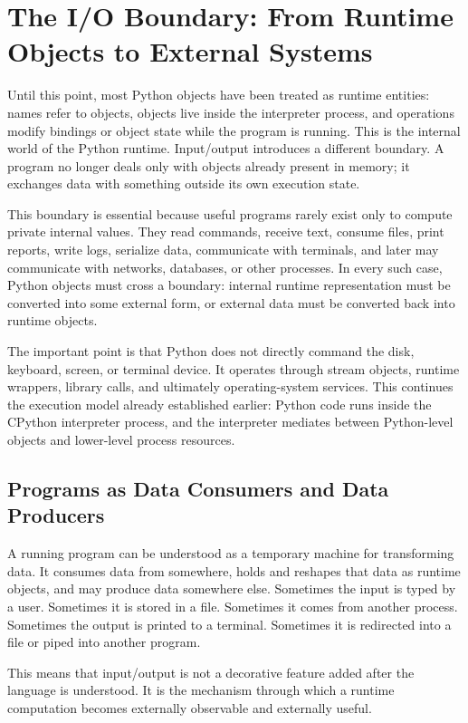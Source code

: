 \section{The I/O Boundary: From Runtime Objects to External Systems}

Until this point, most Python objects have been treated as runtime entities: names refer to objects, objects live inside the interpreter process, and operations modify bindings or object state while the program is running. This is the internal world of the Python runtime. Input/output introduces a different boundary. A program no longer deals only with objects already present in memory; it exchanges data with something outside its own execution state.

This boundary is essential because useful programs rarely exist only to compute private internal values. They read commands, receive text, consume files, print reports, write logs, serialize data, communicate with terminals, and later may communicate with networks, databases, or other processes. In every such case, Python objects must cross a boundary: internal runtime representation must be converted into some external form, or external data must be converted back into runtime objects.

The important point is that Python does not directly command the disk, keyboard, screen, or terminal device. It operates through stream objects, runtime wrappers, library calls, and ultimately operating-system services. This continues the execution model already established earlier: Python code runs inside the CPython interpreter process, and the interpreter mediates between Python-level objects and lower-level process resources.

\subsection{Programs as Data Consumers and Data Producers}

A running program can be understood as a temporary machine for transforming data. It consumes data from somewhere, holds and reshapes that data as runtime objects, and may produce data somewhere else. Sometimes the input is typed by a user. Sometimes it is stored in a file. Sometimes it comes from another process. Sometimes the output is printed to a terminal. Sometimes it is redirected into a file or piped into another program.

This means that input/output is not a decorative feature added after the language is understood. It is the mechanism through which a runtime computation becomes externally observable and externally useful.

